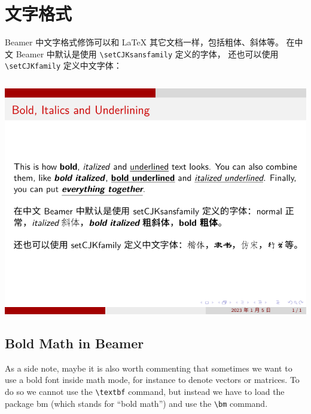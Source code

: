 \section{文字格式}

Beamer 中文字格式修饰可以和 {\LaTeX} 其它文档一样，包括粗体、斜体等。
在中文 Beamer 中默认是使用 \verb|\setCJKsansfamily| 定义的字体，
还也可以使用 \verb|\setCJKfamily| 定义中文字体：

\inputminted[linenos=true]{latex}{examples/beamer/beamertextformat01.tex}

\includegraphics{examples/beamer/beamertextformat01.pdf}

\subsection{Bold Math in Beamer}

As a side note, maybe it is also worth commenting that sometimes we want to use a bold font inside math mode, for instance to denote vectors or matrices. To do so we cannot use the \verb|\textbf| command, but instead we have to load the package bm (which stands for “bold math”) and use the \verb|\bm| command.

\inputminted[linenos=true]{latex}{examples/beamer/beamertextformat02.tex}

